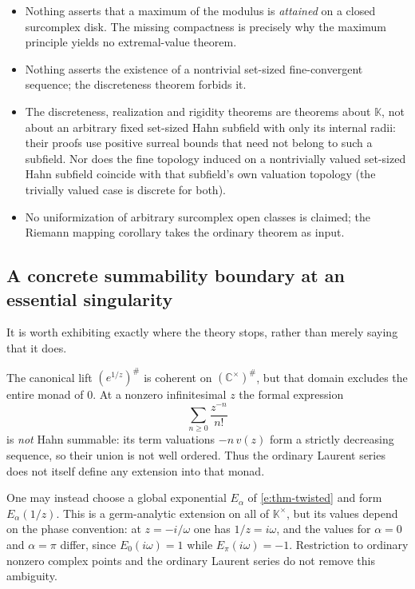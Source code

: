 \documentclass[11pt,a4paper]{article}
\numberwithin{equation}{section}
\theoremstyle{definition}
\theoremstyle{remark}
\theoremstyle{plain}
\newcommand{\K}{\mathbb K}
\newcommand{\CC}{\mathbb C}
\newcommand{\halo}[1]{#1^{\#}}
\newcommand{\ev}[1]{#1^{\#}}
\begin{document}
\begin{itemize}[leftmargin=1.4em]
 which fixes every surreal coefficient, is provably incompatible with a
 field derivation normalized by $\partial\omega=1$
 (\ref{b:derivation-obstruction}).
\item Nothing asserts that a maximum of the modulus is \emph{attained}
 on a closed surcomplex disk.  The missing compactness is precisely why
 the maximum principle yields no extremal-value theorem.
\item Nothing asserts the existence of a nontrivial set-sized
 fine-convergent sequence; the discreteness theorem forbids it.
\item The discreteness, realization and rigidity theorems are theorems
 about $\K$, not about an arbitrary fixed set-sized Hahn subfield with
 only its internal radii: their proofs use positive surreal bounds that
 need not belong to such a subfield.  Nor does the fine topology induced
 on a nontrivially valued set-sized Hahn subfield coincide with that
 subfield's own valuation topology (the trivially valued case is
 discrete for both).
\item No uniformization of arbitrary surcomplex open classes is claimed;
 the Riemann mapping corollary takes the ordinary theorem as input.
\end{itemize}

\subsection{A concrete summability boundary at an essential
singularity}\label{f:sub-essential}

It is worth exhibiting exactly where the theory stops, rather than
merely saying that it does.

The canonical lift $\ev{(e^{1/z})}$ is coherent on
$\halo{(\CC^{\times})}$, but that domain excludes the entire monad of
$0$.  At a nonzero infinitesimal $z$ the formal expression
\[
 \sum_{n\ge0}\frac{z^{-n}}{n!}
\]
is \emph{not} Hahn summable: its term valuations $-n\,v(z)$ form a
strictly decreasing sequence, so their union is not well ordered.  Thus
the ordinary Laurent series does not itself define any extension into
that monad.

One may instead choose a global exponential $E_{\alpha}$ of
\ref{e:thm-twisted} and form $E_{\alpha}(1/z)$.  This is a germ-analytic
extension on all of $\K^{\times}$, but its values depend on the phase
convention: at $z=-i/\omega$ one has $1/z=i\omega$, and the values for
$\alpha=0$ and $\alpha=\pi$ differ, since $E_{0}(i\omega)=1$ while
$E_{\pi}(i\omega)=-1$.  Restriction to ordinary nonzero complex points
and the ordinary Laurent series do not remove this ambiguity.
\end{document}
